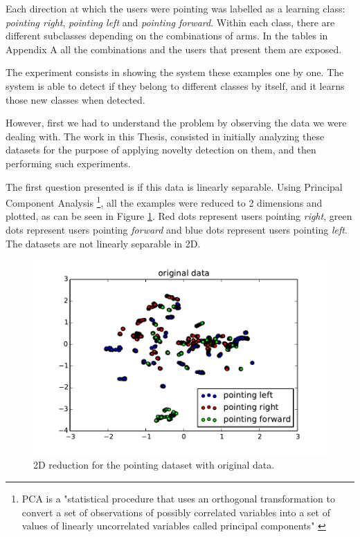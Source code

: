 Each direction at which the users were pointing was labelled as a learning class: \emph{pointing right}, \emph{pointing left} and \emph{pointing forward}. Within each class, there are different subclasses depending on the combinations of arms. In the tables in Appendix A all the combinations and the users that present them are exposed.

The experiment consists in showing the system these examples one by one. The system is able to detect if they belong to different classes by itself, and it learns those new classes when detected. 

However, first we had to understand the problem by observing the data we were dealing with. The work in this Thesis, consisted in initially analyzing these datasets for the purpose of applying novelty detection on them, and then performing such experiments. 

The first question presented is if this data is linearly separable. Using Principal Component Analysis \footnote{PCA is a "statistical procedure that uses an orthogonal transformation to convert a set of observations of possibly correlated variables into a set of values of linearly uncorrelated variables called principal components" \cite{pca}}, all the examples were reduced to 2 dimensions and plotted, as can be seen in Figure \ref{fig:exp03}. Red dots represent users pointing \emph{right}, green dots represent users pointing \emph{forward} and blue dots represent users pointing \emph{left}. The datasets are not linearly separable in 2D.

\begin{figure}[h]
\includegraphics[width=14cm]{Figures/exp03}
\centering
\caption{2D reduction for the pointing dataset with original data. \label{fig:exp03}}
\end{figure}

